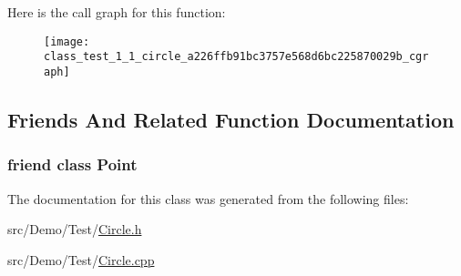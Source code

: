Here is the call graph for this function\+:\nopagebreak
\begin{figure}[H]
\begin{center}
\leavevmode
\texttt{[image: class\_test\_1\_1\_circle\_a226ffb91bc3757e568d6bc225870029b\_cgraph]}
\end{center}
\end{figure}




\subsection{Friends And Related Function Documentation}
\hypertarget{class_test_1_1_circle_aa238d52f825b8ea8da6a5c4ae1b8d482}{
\subsubsection[{Point}]{\setlength{\rightskip}{0pt plus 5cm}friend class {\bf Point}\hspace{0.3cm}{\ttfamily [friend]}}}\label{class_test_1_1_circle_aa238d52f825b8ea8da6a5c4ae1b8d482}


The documentation for this class was generated from the following files\+:\begin{DoxyCompactItemize}
\item 
src/\+Demo/\+Test/\hyperlink{_circle_8h}{Circle.\+h}\item 
src/\+Demo/\+Test/\hyperlink{_circle_8cpp}{Circle.\+cpp}\end{DoxyCompactItemize}
